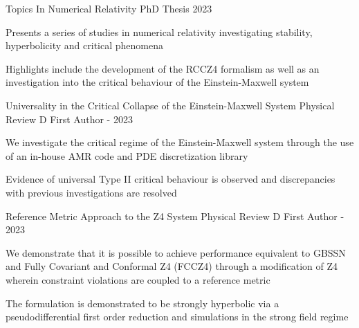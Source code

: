 

\begin{cventries}
    \cvskillentry
    {Topics In Numerical Relativity} %
    {PhD Thesis} %
    {} %
    {2023} %
    {\begin{cvitems} %
        \item Presents a series of studies in numerical relativity investigating stability, hyperbolicity and critical phenomena
        \item Highlights include the development of the RCCZ4 formalism as well as an investigation into the critical behaviour of the Einstein-Maxwell system
    \end{cvitems}}
    
    
    \cvskillentry
    {Universality in the Critical Collapse of the Einstein-Maxwell System} %
    {Physical Review D} %
    {} %
    {First Author - 2023} %
    {\begin{cvitems} %
        \item We investigate the critical regime of the Einstein-Maxwell system through the use of an in-house AMR code and PDE discretization library
        \item Evidence of universal Type II critical behaviour is observed and discrepancies with previous investigations are resolved
    \end{cvitems}}

    \cvskillentry
    {Reference Metric Approach to the Z4 System} %
    {Physical Review D} %
    {} %
    {First Author - 2023} %
    {\begin{cvitems} %
        \item We demonstrate that it is possible to achieve performance equivalent to GBSSN and Fully Covariant and Conformal Z4 (FCCZ4) through a modification of Z4 wherein constraint violations are coupled to a reference metric
        \item The formulation is demonstrated to be strongly hyperbolic via a pseudodifferential first order reduction and simulations in the strong field regime
    \end{cvitems}}
    

\end{cventries}
